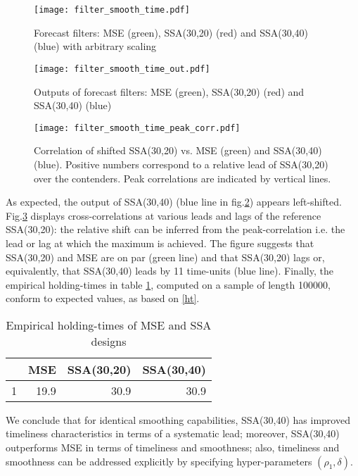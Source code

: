 \documentclass[a4paper]{article}
\begin{document}
\begin{figure}[H]\begin{center}\texttt{[image: filter\_smooth\_time.pdf]}\caption{Forecast filters: MSE (green), SSA(30,20) (red) and SSA(30,40) (blue) with arbitrary scaling\label{filters_smooth_time}}\end{center}\end{figure}\begin{figure}[H]\begin{center}\texttt{[image: filter\_smooth\_time\_out.pdf]}\caption{Outputs of forecast filters: MSE (green), SSA(30,20) (red) and SSA(30,40) (blue)\label{filters_smooth_time_out}}\end{center}\end{figure}\begin{figure}[H]\begin{center}\texttt{[image: filter\_smooth\_time\_peak\_corr.pdf]}\caption{Correlation of shifted SSA(30,20) vs. MSE (green) and SSA(30,40) (blue). Positive numbers correspond to a relative lead of SSA(30,20) over the contenders. Peak correlations are indicated by vertical lines.\label{filters_smooth_time_peak_cor}}\end{center}\end{figure}As expected, the output of SSA(30,40) (blue line in fig.\ref{filters_smooth_time_out}) appears left-shifted. Fig.\ref{filters_smooth_time_peak_cor} displays cross-correlations at various leads and lags of the reference SSA(30,20): the relative shift can be inferred from the  peak-correlation i.e. the lead or lag at which the maximum is achieved. The figure suggests that SSA(30,20) and MSE are on par (green line) and that SSA(30,20) lags or, equivalently, that SSA(30,40) leads by 11 time-units (blue line). %
Finally, the empirical holding-times in table \ref{smooth_time_emp_ht}, computed on a sample of length 100000, conform to expected values, as based on \ref{ht}.
\begin{table}[ht]
\centering
\begin{tabular}{rrrr}
  \hline
 & MSE & SSA(30,20) & SSA(30,40) \\ 
  \hline
1 & 19.9 & 30.9 & 30.9 \\ 
   \hline
\end{tabular}
\caption{Empirical holding-times of MSE and SSA designs} 
\label{smooth_time_emp_ht}
\end{table}We conclude that for identical smoothing capabilities, SSA(30,40) has improved timeliness characteristics in terms of a systematic lead; moreover, SSA(30,40) outperforms MSE in terms of timeliness and smoothness; also, timeliness and smoothness can be addressed explicitly by specifying hyper-parameters $(\rho_1,\delta)$. 
\end{document}
